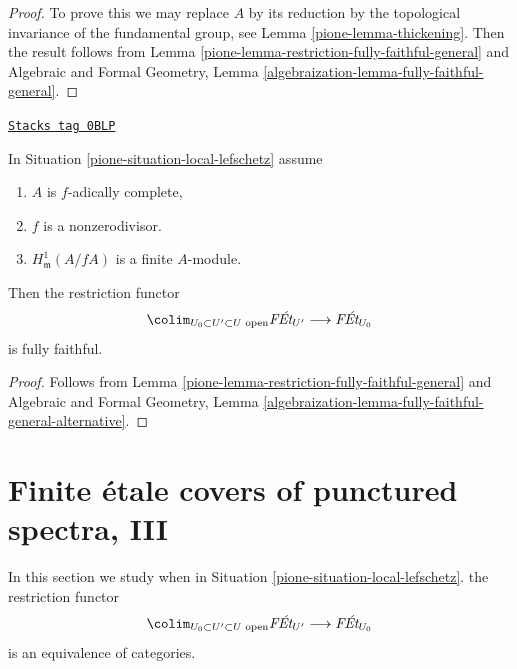 \begin{proof}

To prove this we may replace $A$ by its reduction by the topological
invariance of the fundamental group, see Lemma \ref{pione-lemma-thickening}.
Then the result follows from
Lemma \ref{pione-lemma-restriction-fully-faithful-general}
and Algebraic and Formal Geometry, Lemma
\ref{algebraization-lemma-fully-faithful-general}.
\end{proof}

\begin{lemma}
\label{pione-lemma-fully-faithful-general}
\href{https://stacks.math.columbia.edu/tag/0BLP}{\texttt{Stacks tag 0BLP}}

In Situation \ref{pione-situation-local-lefschetz} assume
\begin{enumerate}
\item $A$ is $f$-adically complete,
\item $f$ is a nonzerodivisor.
\item $H^1_\mathfrak m(A/fA)$ is a finite $A$-module.
\end{enumerate}
Then the restriction functor
$$
\colim_{U_0 \subset U' \subset U\text{ open}} \textit{F\'Et}_{U'}
\longrightarrow
\textit{F\'Et}_{U_0}
$$
is fully faithful.
\end{lemma}

\begin{proof}

Follows from
Lemma \ref{pione-lemma-restriction-fully-faithful-general} and
Algebraic and Formal Geometry, Lemma
\ref{algebraization-lemma-fully-faithful-general-alternative}.
\end{proof}

\section{Finite \'etale covers of punctured spectra, III}
\label{pione-section-pi1-punctured-spec-III}
In this section we study when in Situation \ref{pione-situation-local-lefschetz}.
the restriction functor
$$
\colim_{U_0 \subset U' \subset U\text{ open}} \textit{F\'Et}_{U'}
\longrightarrow
\textit{F\'Et}_{U_0}
$$
is an equivalence of categories.


